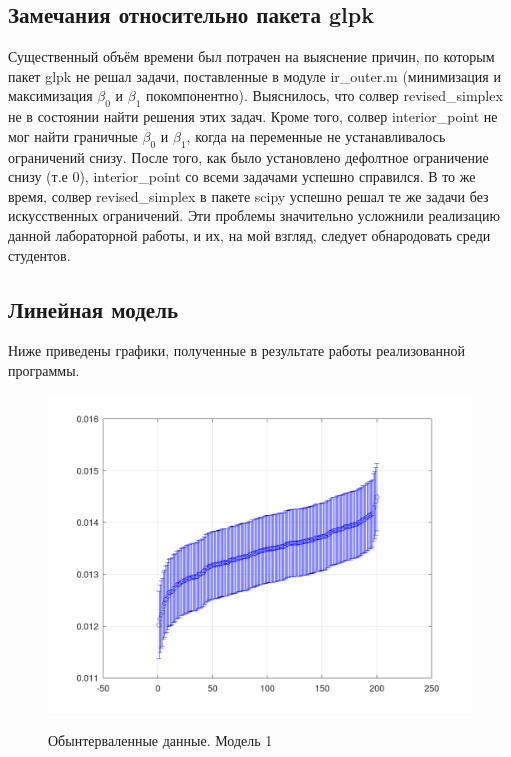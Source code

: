\subsection{Замечания относительно пакета glpk}

Существенный объём времени был потрачен на выяснение причин, по которым пакет glpk не решал задачи, поставленные в модуле ir\_outer.m (минимизация и максимизация $\beta_0$ и $\beta_1$ покомпонентно). Выяснилось, что солвер revised\_simplex не в состоянии найти решения этих задач. Кроме того, солвер interior\_point не мог найти граничные $\beta_0$ и $\beta_1$, когда на переменные не устанавливалось ограничений снизу. После того, как было установлено дефолтное ограничение снизу (т.е 0), interior\_point со всеми задачами успешно справился. В то же время, солвер revised\_simplex в пакете scipy успешно решал те же задачи без искусственных ограничений. Эти проблемы значительно усложнили реализацию данной лабораторной работы, и их, на мой взгляд, следует обнародовать среди студентов.

\subsection{Линейная модель}

Ниже приведены графики, полученные в результате работы реализованной программы.

\begin{figure}[H]
	\begin{center}
		\includegraphics[scale=0.29]{interval_problem_1}
		\label{pic:model1}
		\caption{Обынтерваленные данные. Модель 1}
	\end{center}
\end{figure}

